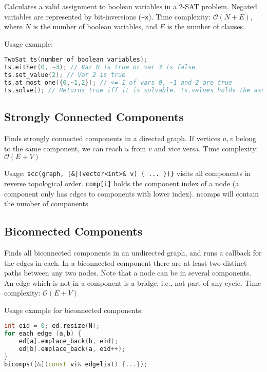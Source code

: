 \documentclass{article}
\begin{document}
Calculates a valid assignment to boolean variables in a 2-SAT problem.
Negated variables are represented by bit-inversions (\lstinline{~x}).
Time complexity: $\mathcal{O}(N+E)$, where $N$ is the number of boolean variables, and $E$ is the number of clauses.



Usage example:
\begin{lstlisting}[language=C++]
TwoSat ts(number of boolean variables);
ts.either(0, ~3); // Var 0 is true or var 3 is false
ts.set_value(2); // Var 2 is true
ts.at_most_one({0,~1,2}); // <= 1 of vars 0, ~1 and 2 are true
ts.solve(); // Returns true iff it is solvable. ts.values holds the assigned values to the variables
\end{lstlisting}

\pagebreak

\subsection*{Strongly Connected Components}

Finds strongly connected components in a directed graph. If vertices $u, v$ belong to the same component, we can reach $u$ from $v$ and vice versa.
Time complexity: $\mathcal{O}(E + V)$

Usage: \lstinline|scc(graph, [&](vector<int>& v) { ... })}| visits all components
in reverse topological order. \texttt{comp[i]} holds the component
index of a node (a component only has edges to components with
lower index). ncomps will contain the number of components.




\subsection*{Biconnected Components}

Finds all biconnected components in an undirected graph, and
runs a callback for the edges in each. In a biconnected component there
are at least two distinct paths between any two nodes. Note that a node can
be in several components. An edge which is not in a component is a bridge,
i.e., not part of any cycle. Time complexity: $\mathcal{O}(E + V)$



Usage example for biconnected components:
\begin{lstlisting}[language=C++]
int eid = 0; ed.resize(N);
for each edge (a,b) {
    ed[a].emplace_back(b, eid);
    ed[b].emplace_back(a, eid++);
}
bicomps([&](const vi& edgelist) {...});
\end{lstlisting}
\end{document}
